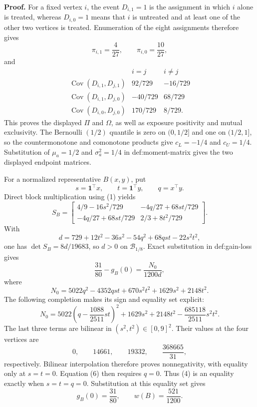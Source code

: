 \textbf{Proof.}
For a fixed vertex \(i\), the event \(D_{i,1}=1\) is the assignment in which \(i\) alone is treated, whereas \(D_{i,0}=1\) means that \(i\) is untreated and at least one of the other two vertices is treated.  Enumeration of the eight assignments therefore gives
\[
\pi_{i,1}=\frac4{27},
\qquad
\pi_{i,0}=\frac{10}{27},
\]
and
\[
\begin{array}{c|cc}
&i=j&i\ne j\\ \hline
\operatorname{Cov}(D_{i,1},D_{j,1})&92/729&-16/729\\
\operatorname{Cov}(D_{i,1},D_{j,0})&-40/729&68/729\\
\operatorname{Cov}(D_{i,0},D_{j,0})&170/729&8/729.
\end{array}
\tag{1}
\]
This proves the displayed \(\Pi\) and \(\Omega\), as well as exposure positivity and mutual exclusivity.  The Bernoulli \((1/2)\) quantile is zero on \((0,1/2]\) and one on \((1/2,1]\), so the countermonotone and comonotone products give \(c_L=-1/4\) and \(c_U=1/4\).  Substitution of \(\mu_a=1/2\) and \(\sigma_a^2=1/4\) in def:moment-matrix gives the two displayed endpoint matrices.

For a normalized representative \(B(x,y)\), put
\[
s=\mathbf1^{\top}x,
\qquad t=\mathbf1^{\top}y,
\qquad q=x^{\top}y.
\]
Direct block multiplication using (1) yields
\[
S_B=
\begin{bmatrix}
4/9-16s^2/729&-4q/27+68st/729\\
-4q/27+68st/729&2/3+8t^2/729
\end{bmatrix}.
\tag{2}
\]
With
\[
d=729+12t^2-36s^2-54q^2+68qst-22s^2t^2,
\tag{3}
\]
one has \(\det S_B=8d/19683\), so \(d>0\) on \(\mathcal B_{1/8}\).  Exact substitution in def:gain-loss gives
\[
\frac{31}{80}-g_B(0)=\frac{N_0}{1200d},
\tag{4}
\]
where
\[
N_0=5022q^2-4352qst+670s^2t^2+1629s^2+2148t^2.
\tag{5}
\]
The following completion makes its sign and equality set explicit:
\[
N_0
=5022\left(q-\frac{1088}{2511}st\right)^2
+1629s^2+2148t^2-\frac{685118}{2511}s^2t^2.
\tag{6}
\]
The last three terms are bilinear in \((s^2,t^2)\in[0,9]^2\).  Their values at the four vertices are
\[
0,\qquad14661,\qquad19332,\qquad\frac{368665}{31},
\]
respectively.  Bilinear interpolation therefore proves nonnegativity, with equality only at \(s=t=0\).  Equation (6) then requires \(q=0\).  Thus (4) is an equality exactly when \(s=t=q=0\).  Substitution at this equality set gives
\[
g_B(0)=\frac{31}{80},
\qquad
w(B)=\frac{521}{1200}.
\tag{7}
\]


